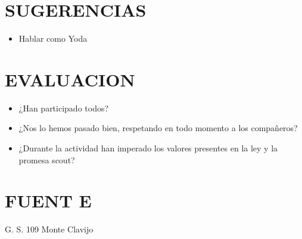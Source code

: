 \documentclass[72pt]{article}
\begin{document}
\section*{SUGERENCIAS}
\begin{itemize}
    \item Hablar como Yoda
\end{itemize}

\section*{EVALUACION} 
\begin{itemize}
    \item ¿Han participado todos?
    \item ¿Nos lo hemos pasado bien, respetando en todo momento a los compañeros?
    \item ¿Durante la actividad han imperado los valores presentes en la ley y la
        promesa scout?
\end{itemize}

\section*{FUENT E}
G. S. 109 Monte Clavijo
\end{document}
